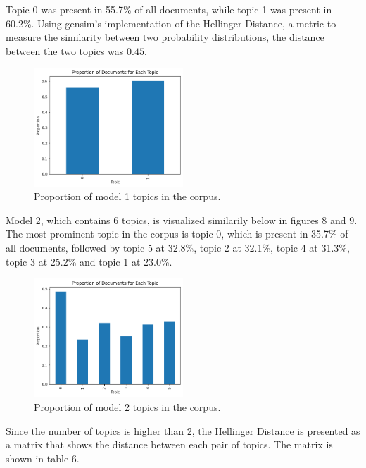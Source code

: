 Topic 0 was present in 55.7\% of all documents, while topic 1 was present in 60.2\%. Using gensim's implementation of the Hellinger Distance, a metric to measure the similarity between two probability distributions, the distance between the two topics was $0.45$.

\begin{figure}[H]
    \centering
    \includegraphics[width=0.5\textwidth]{resources/proportion_n_2.png}
    \caption{Proportion of model 1 topics in the corpus.}
    \label{fig:proportion_n_2}
\end{figure}

Model 2, which contains 6 topics, is visualized similarily below in figures 8 and 9. The most prominent topic in the corpus is topic 0, which is present in 35.7\% of all documents, followed by topic 5 at 32.8\%, topic 2 at 32.1\%, topic 4 at 31.3\%, topic 3 at 25.2\% and topic 1 at 23.0\%.

\begin{figure}[H]
    \centering
    \includegraphics[width=0.5\textwidth]{resources/proportion_n_6.png}
    \caption{Proportion of model 2 topics in the corpus.}
    \label{fig:proportion_n_6}
\end{figure}

Since the number of topics is higher than 2, the Hellinger Distance is presented as a matrix that shows the distance between each pair of topics. The matrix is shown in table 6.

